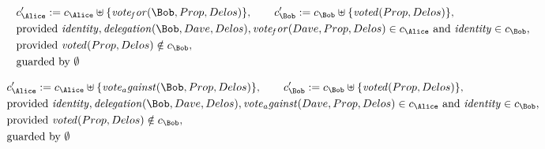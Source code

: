 \begin{align*}
&
c'_
{
\Alice
}
 := 
c_
{
\Alice
}
 \uplus 
\{
\mathit{
vote_for
}
(
\Bob
,
Prop
,
Delos
)
\}
, \qquad 
c'_
{
\Bob
}
 := 
c_
{
\Bob
}
 \uplus 
\{
\mathit{
voted
}
(
Prop
,
Delos
)
\}
,\\
&
\text{provided } 
\mathit{
identity
}
,
\mathit{
delegation
}
(
\Bob
,
Dave
,
Delos
)
,
\mathit{
vote_for
}
(
Dave
,
Prop
,
Delos
)
 \in c_
{
\Alice
}
 \text{ and } 
\mathit{
identity
}
 \in c_
{
\Bob
}
,\\
&
\text{provided } 
\mathit{
voted
}
(
Prop
,
Delos
)
 \notin c_
{
\Bob
}
,\\
&
\text{guarded by } \emptyset
\end{align*}

\begin{align*}
&
c'_
{
\Alice
}
 := 
c_
{
\Alice
}
 \uplus 
\{
\mathit{
vote_against
}
(
\Bob
,
Prop
,
Delos
)
\}
, \qquad 
c'_
{
\Bob
}
 := 
c_
{
\Bob
}
 \uplus 
\{
\mathit{
voted
}
(
Prop
,
Delos
)
\}
,\\
&
\text{provided } 
\mathit{
identity
}
,
\mathit{
delegation
}
(
\Bob
,
Dave
,
Delos
)
,
\mathit{
vote_against
}
(
Dave
,
Prop
,
Delos
)
 \in c_
{
\Alice
}
 \text{ and } 
\mathit{
identity
}
 \in c_
{
\Bob
}
,\\
&
\text{provided } 
\mathit{
voted
}
(
Prop
,
Delos
)
 \notin c_
{
\Bob
}
,\\
&
\text{guarded by } \emptyset
\end{align*}
